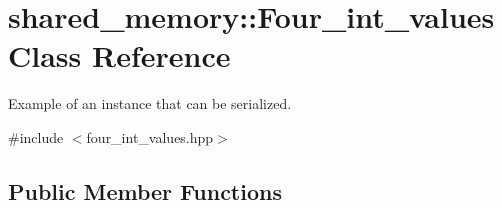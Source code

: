 \hypertarget{classshared__memory_1_1Four__int__values}{}\section{shared\+\_\+memory\+:\+:Four\+\_\+int\+\_\+values Class Reference}
\label{classshared__memory_1_1Four__int__values}


Example of an instance that can be serialized.  




{\ttfamily \#include $<$four\+\_\+int\+\_\+values.\+hpp$>$}

\subsection*{Public Member Functions}
